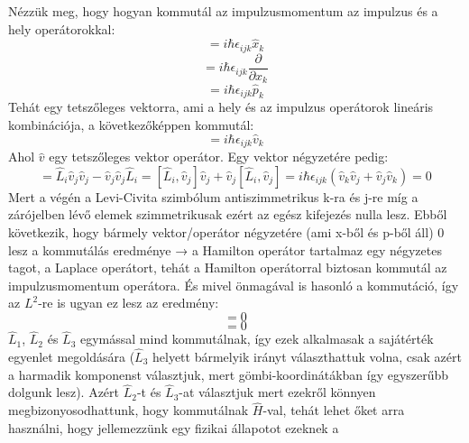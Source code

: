 \documentclass[a4paper,12pt]{article}
\begin{document}
Nézzük meg, hogy hogyan kommutál az impulzusmomentum az impulzus és a hely operátorokkal:
\begin{equation}
    [\hat{L}_i, \hat{x}_j] = i \hbar \epsilon_{ijk} \hat{x}_k
\end{equation}
\begin{equation}
    [\hat{L}_i, \frac{\partial}{\partial x_j}] = i \hbar \epsilon_{ijk} \frac{\partial}{\partial x_k}
\end{equation}
\begin{equation}
    [\hat{L}_i, \hat{p}_j] = i \hbar \epsilon_{ijk} \hat{p}_k
\end{equation}
Tehát egy tetszőleges vektorra, ami a hely és az impulzus operátorok lineáris kombinációja, a következőképpen kommutál:
\begin{equation}
    [\hat{L}_i, \hat{v}_j] = i \hbar \epsilon_{ijk} \hat{v}_k
\end{equation}
Ahol $\hat{v}$ egy tetszőleges vektor operátor. Egy vektor négyzetére pedig:
\begin{equation}
    [\hat{L}_i, \hat{v}^2_j] = \hat{L}_i \hat{v}_j \hat{v}_j - \hat{v}_j \hat{v}_j \hat{L}_i = [\hat{L}_i, \hat{v}_j] \hat{v}_j + \hat{v}_j [\hat{L}_i, \hat{v}_j] = i \hbar \epsilon_{ijk} (\hat{v}_k \hat{v}_j + \hat{v}_j \hat{v}_k) = 0
\end{equation}
Mert a végén a Levi-Civita szimbólum antiszimmetrikus k-ra és j-re míg a zárójelben lévő elemek szimmetrikusak ezért az egész kifejezés nulla lesz. 
Ebből következik, hogy bármely vektor/operátor négyzetére (ami x-ből és p-ből áll) 0 lesz a kommutálás eredménye → a Hamilton operátor tartalmaz
egy négyzetes tagot, a Laplace operátort, tehát a Hamilton operátorral biztosan kommutál az impulzusmomentum operátora. És mivel önmagával
is hasonló a kommutáció, így az $L^2$-re is ugyan ez lesz az eredmény:
\begin{equation}
    [\hat{H}, \hat{L}_i] = 0
\end{equation}
\begin{equation}
    [\hat{L}_i, \hat{L}^2] = 0
\end{equation}
$\hat{L}_1$, $\hat{L}_2$ és $\hat{L}_3$ egymással mind kommutálnak, így ezek alkalmasak a sajátérték egyenlet megoldására ($\hat{L}_3$ helyett bármelyik irányt választhattuk volna, csak
azért a harmadik komponenst választjuk, mert gömbi-koordinátákban így egyszerűbb dolgunk lesz). Azért $\hat{L}_2$-t és $\hat{L}_3$-at választjuk mert ezekről könnyen
megbizonyosodhattunk, hogy kommutálnak $\hat{H}$-val, tehát lehet őket arra használni, hogy jellemezzünk egy fizikai állapotot ezeknek a
\end{document}
